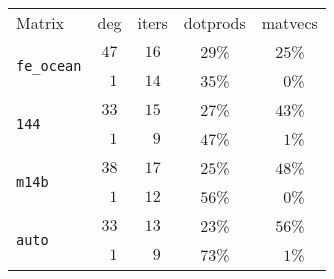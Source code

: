 \begin{tabular}{l|c|c|c|c}
\hline
\multirow{2}{*}{Matrix} & \multirow{2}{*}{deg} & \multirow{2}{*}{iters} & \multirow{2}{*}{dotprods} & \multirow{2}{*}{matvecs} \\
 & & & & \\\hline
\hline
\multirow{2}{*}{\texttt{fe\_ocean}} & $47$ & $16$ & $29$\% & $25$\%\\
  & $\phantom{0}1$ & $14$ & $35$\% & $\phantom{0}0$\%\\\hline
\multirow{2}{*}{\texttt{144}} & $33$ & $15$ & $27$\% & $43$\%\\
  & $\phantom{0}1$ & $\phantom{0}9$ & $47$\% & $\phantom{0}1$\%\\\hline
\multirow{2}{*}{\texttt{m14b}} & $38$ & $17$ & $25$\% & $48$\%\\
  & $\phantom{0}1$ & $12$ & $56$\% & $\phantom{0}0$\%\\\hline
\multirow{2}{*}{\texttt{auto}} & $33$ & $13$ & $23$\% & $56$\%\\
  & $\phantom{0}1$ & $\phantom{0}9$ & $73$\% & $\phantom{0}1$\%\\\hline
\end{tabular}